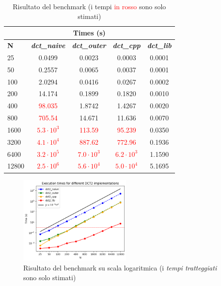     \begin{table}[h]
        \centering
        \label{tab:benchmark}
        \begin{tabular}{lcccc}
            \toprule
            \multicolumn{5}{c}{\textbf{Times (s)}} \\
            \midrule
            \textbf{N} & \textbf{\textit{dct\_naive}} & \textbf{\textit{dct\_outer}} & \textbf{\textit{dct\_cpp}} & \textbf{\textit{dct\_lib}} \\
            \midrule
            25  & 0.0499 & 0.0023 & 0.0003 & 0.0001 \\
            50  & 0.2557 & 0.0065 & 0.0037 & 0.0001 \\
            100 & 2.0294 & 0.0416 & 0.0267 & 0.0002 \\
            200 & 14.174 & 0.1899 & 0.1820 & 0.0010 \\
            400 & \textcolor{red}{98.035} & 1.8742 & 1.4267 & 0.0020 \\
            800 & \textcolor{red}{705.54} & 14.671 & 11.636 & 0.0070 \\
            1600 & \textcolor{red}{$5.3 \cdot 10^3$} & \textcolor{red}{113.59} & \textcolor{red}{95.239} & 0.0350 \\
            3200 & \textcolor{red}{$4.1 \cdot 10^4$} & \textcolor{red}{887.62} & \textcolor{red}{772.96} & 0.1936 \\
            6400 & \textcolor{red}{$3.2 \cdot 10^5$} & \textcolor{red}{$7.0 \cdot 10^3$} & \textcolor{red}{$6.2 \cdot 10^3$} & 1.1590 \\
            12800 & \textcolor{red}{$2.5 \cdot 10^6$} & \textcolor{red}{$5.6 \cdot 10^4$} & \textcolor{red}{$5.0 \cdot 10^4$} & 5.1695 \\
            \bottomrule
        \end{tabular}
        \caption{Risultato del benchmark (i tempi \textcolor{red}{in rosso} sono solo stimati)}
    \end{table}

    \begin{figure}[h]
        \centering
        \includegraphics[width=0.5\textwidth]{images/times_plot.png}
        \caption{Risultato del benchmark su scala logaritmica (i \textit{tempi tratteggiati} sono solo stimati)}
        \label{fig:times_plot}
    \end{figure}


